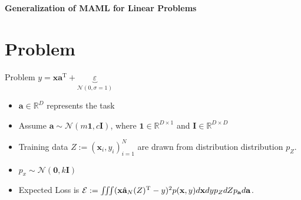 \documentclass[aspectratio=169]{beamer}
\author{\authorlabel}
\newcommand{\mysubtitle}{\color{Pink}\Large{\textbf{Generalization of MAML for Linear Problems}}}
\begin{document}



\begin{frame}
	\centering
	\mysubtitle
\end{frame}

\section{Problem}
\begin{frame}{Problem}
  \centering
   $y = \mathbf{x}\mathbf{a}^\text{T} + \underbrace{\varepsilon}_{\mathcal{N}(0,\sigma=1)}$
  \begin{itemize}
    \item $\mathbf{a}\in\mathbb{R}^D$ represents the task
    \item Assume $\mathbf{a}\sim\mathcal{N}(m\boldsymbol{1},c\boldsymbol{I})$, where $\boldsymbol{1}\in\mathbb{R}^{D\times 1}$ and $\boldsymbol{I}\in\mathbb{R}^{D\times D}$
    \item Training data $Z:=(\mathbf{x}_i,y_i)_{i=1}^{N}$ are drawn from distribution distribution $p_Z$.
    \item $p_x \sim \mathcal{N}(\boldsymbol{0},k\boldsymbol{I})$
    \item Expected Loss is  $\mathcal{E}:=\large\iiint(\mathbf{x}\hat{\mathbf{a}}_N(Z)^\text{T}-y)^2p(\mathbf{x},y)d\mathbf{x}dyp_ZdZp_\mathbf{a}d\mathbf{a}$.
  \end{itemize}
\end{frame}
\end{document}
